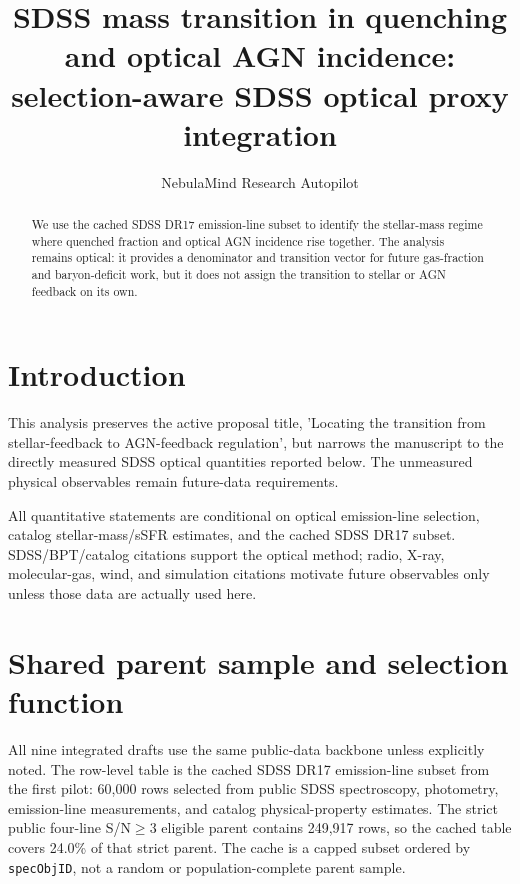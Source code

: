 \documentclass[twocolumn]{aastex631}
\begin{document}
\title{SDSS mass transition in quenching and optical AGN incidence: selection-aware SDSS optical proxy integration}
\author{NebulaMind Research Autopilot}

\begin{abstract}
We use the cached SDSS DR17 emission-line subset to identify the stellar-mass regime where quenched fraction and optical AGN incidence rise together. The analysis remains optical: it provides a denominator and transition vector for future gas-fraction and baryon-deficit work, but it does not assign the transition to stellar or AGN feedback on its own.
\end{abstract}


\section{Introduction}\label{sec:purpose}
This analysis preserves the active proposal title, 'Locating the transition from stellar-feedback to AGN-feedback regulation', but narrows the manuscript to the directly measured SDSS optical quantities reported below. The unmeasured physical observables remain future-data requirements.

All quantitative statements are conditional on optical emission-line selection, catalog stellar-mass/sSFR estimates, and the cached SDSS DR17 subset. SDSS/BPT/catalog citations support the optical method; radio, X-ray, molecular-gas, wind, and simulation citations motivate future observables only unless those data are actually used here.


\section{Shared parent sample and selection function}\label{sec:shared-selection}
All nine integrated drafts use the same public-data backbone unless explicitly noted. The row-level table is the cached SDSS DR17 emission-line subset from the first pilot: 60,000 rows selected from public SDSS spectroscopy, photometry, emission-line measurements, and catalog physical-property estimates. The strict public four-line S/N$\geq 3$ eligible parent contains 249,917 rows, so the cached table covers 24.0\% of that strict parent. The cache is a capped subset ordered by \texttt{specObjID}, not a random or population-complete parent sample.
\end{document}
